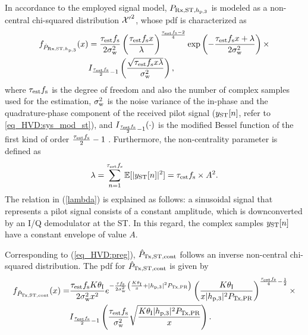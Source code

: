 In accordance to the employed signal model, $P_{\text{Rx,ST,$h_{\text{p,3}}$}}$ is modeled as a non-central chi-squared distribution $\ncchi2$, whose pdf is characterized as \cite{Char99}
\begin{align}
	\label{nxc2equ}
	f_{\hat{P}_{\text{Rx,ST,$h_{\text{p,3}}$}}} (x) &= 
	\frac{\tau_{\text{est}} f_{\text{s}}}{2\sigma^2_{\text{w}}} \left(\frac{\tau_{\text{est}} f_{\text{s}} x}{\lambda}\right)^\frac{\tau_{\text{est}} f_{\text{s}}-2}{4} \exp\left(-\frac{\tau_{\text{est}} f_{\text{s}} x+\lambda}{2\sigma^2_{\text{w}}}\right)  \times \\ 
	\quad & I_{ \frac{\tau_{\text{est}} f_{\text{s}}}{2}-1 }\left(\frac{\sqrt{\tau_{\text{est}} f_{\text{s}} x \lambda}}{\sigma^2_{\text{w}}}\right) \nonumber  ,
\end{align}
where $\tau_{\text{est}} f_{\text{s}}$ is the degree of freedom and also the number of complex samples used for the estimation, $\sigma^2_{\text{w}}$ is the noise variance of the in-phase and the quadrature-phase component of the received pilot signal ($y_{\text{ST}}[n]$, refer to \ref{eq_HVD:sys_mod_st}), and $I_{\frac{\tau_{\text{est}} f_{\text{s}}}{2}-1}(\cdot)$ is the modified Bessel function of the first kind of order $\frac{\tau_{\text{est}} f_{\text{s}}}{2}-1$ \cite{Jef00}. Furthermore, the non-centrality parameter is defined as
\begin{equation}
	\label{lambda}
	\lambda = \sum_{n=1}^{\tau_{\text{est}} f_{\text{s}}} \mathbb{E}[|y_{\text{ST}}[n]|^2] = \tau_{\text{est}} f_{\text{s}} \times A^2.
\end{equation}
The relation in (\ref{lambda}) is explained as follows: a sinusoidal signal that represents a pilot signal consists of a constant amplitude, which is downconverted by an I/Q demodulator at the ST. In this regard, the complex samples $y_{\text{ST}}[n]$ have a constant envelope of value $A$. 

Corresponding to (\ref{eq_HVD:preg}), $\hat{P}_{\text{Tx,ST,cont}}$ follows an inverse non-central chi-squared distribution. The pdf for $\hat{P}_{\text{Tx,ST,cont}}$  is given by
\begin{align}
f_{\hat{P}_{\text{Tx,ST,cont}}}(x) =& \frac{\tau_{\text{est}} f_{\text{s}} K \theta_{\text{I}}}{2\sigma^2_{\text{w}} x^2} e^{- \frac{\tau f_{\text{s}}}{2 \sigma^2_{\text{w}}}\left( \frac{K  \theta_{\text{I}}}{x} + |h_{\text{p,3}}|^2 P_{\text{Tx,PR}} \right)} \left( \frac{K \theta_{\text{I}}}{x |h_{\text{p,3}}|^2 P_{\text{Tx,PR}}}   \right)^{\frac{\tau_{\text{est}} f_{\text{s}}}{4} - \frac{1}{2}} \label{eq_HVD:dpreg_pl} \times \\
\quad & I_{\frac{\tau_{\text{est}} f_{\text{s}}}{2}  - 1}\left( \frac{\tau_{\text{est}} f_{\text{s}}}{\sigma^2_{\text{w}}} \sqrt{\frac{ K \theta_{\text{I}} |h_{\text{p,3}}|^2 P_{\text{Tx,PR}}}{x}}  \right). \nonumber
\end{align}

